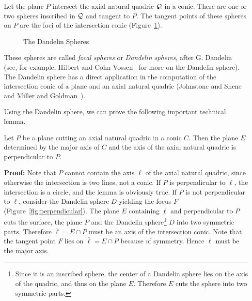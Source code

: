 \begin{theorem}
\label{thm:dandelin-sphere}
     Let the plane $P$ intersect the axial natural quadric ${\cal Q}$ in a
conic.  There are one or two spheres inscribed in ${\cal Q}$ and tangent to
$P$.  The tangent points of these spheres on $P$ are the foci of the
intersection conic (Figure~\ref{fig:dandelin-sphere-and-foci}).
\end{theorem}

\begin{figure}
\vspace{8.5cm}
\caption{The Dandelin Spheres}
\label{fig:dandelin-sphere-and-foci}
\end{figure}

     These spheres are called {\em focal spheres} or {\em Dandelin spheres},
after G. Dandelin~\cite{dandelin:1822} (see, for example, Hilbert and
Cohn-Vossen~\cite{hilbert:1952} for more on the Dandelin sphere).
The Dandelin sphere has a direct application
in the computation of the intersection conic of a plane and an axial natural
quadric (Johnstone and Shene~\cite{johnstone-shene:1991} and
Miller and Goldman~\cite{m-g:1991a}).

     Using the Dandelin sphere, we can prove the following important
technical lemma.

\begin{lemma}
\label{lemma:perpendicular-stuff}
     Let $P$ be a plane cutting an axial natural quadric in a conic $C$.
Then the plane $E$ determined by the major axis of $C$ and the axis of
the axial natural quadric is perpendicular to $P$.
\end{lemma}
{\bf Proof:} Note that $P$ cannot contain the axis $\ell$ of the axial
natural quadric, since otherwise the intersection is two lines, not a
conic. If $P$ is perpendicular to $\ell$, the intersection is a circle,
and the lemma is obviously true.   If $P$ is not perpendicular to $\ell$,
consider the Dandelin sphere $D$ yielding the focus $F$
(Figure~\ref{fig:perpendicular}).  The plane $E$ containing $\ell$ and
perpendicular to $P$ cuts the surface, the plane $P$ and the Dandelin
sphere\footnote{Since it is an inscribed sphere,
     the center of a Dandelin sphere lies on the axis of the quadric,
     and thus on the plane $E$.  Therefore $E$ cuts the sphere into two
     symmetric parts.}
$D$ into two symmetric parts.
Therefore $\bar{\ell}=E\cap P$ must be an axis
of the intersection conic.  Note that the tangent point $F$ lies on
$\bar{\ell}=E\cap P$ because of symmetry.
Hence $\ell$ must be the major axis.  \QED

